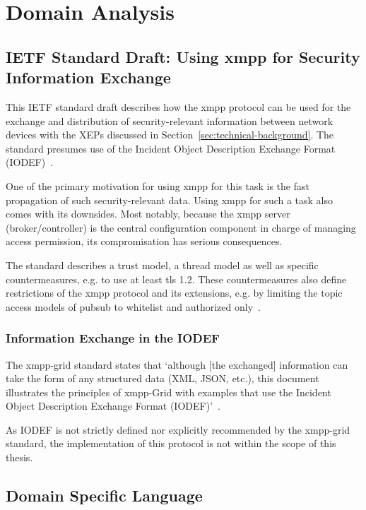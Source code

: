 \section{Domain Analysis}

\subsection{IETF Standard Draft: Using \gls{xmpp} for Security Information Exchange}\label{sec:ietf-standard-draft-using-xmpp-for-security-information-exchange}
This IETF standard draft describes how the \gls{xmpp} protocol can be used for the exchange and distribution of security-relevant information between network devices with the XEPs discussed in Section~\ref{sec:technical-background}. The standard presumes use of the Incident Object Description Exchange Format (IODEF)~\cite{rfc7970}.

One of the primary motivation for using \gls{xmpp} for this task is the fast propagation of such security-relevant data.
Using \gls{xmpp} for such a task also comes with its downsides. Most notably, because the \gls{xmpp} server (\gls{broker}/\gls{controller}) is the central configuration component in charge of managing access permission, its compromisation has serious consequences.

The standard describes a trust model, a thread model as well as specific countermeasures, e.g. to use at least \gls{tls} 1.2. These countermeasures also define restrictions of the \gls{xmpp} protocol and its extensions, e.g. by limiting the \gls{topic} access models of \gls{pubsub} to whitelist and authorized only~\cite{ietf-mile-xmpp-grid-05}.

\subsubsection{Information Exchange in the IODEF}

The \gls{xmpp-grid} standard states that `although [the exchanged] information can take the form of any structured data (XML, JSON, etc.), this document illustrates the principles of \gls{xmpp}-Grid with examples that use the Incident Object Description Exchange Format (IODEF)'~\cite{ietf-mile-xmpp-grid-05}.

As IODEF is not strictly defined nor explicitly recommended by the \gls{xmpp-grid} standard, the implementation of this protocol is not within the scope of this thesis.

\subsection{Domain Specific Language}

